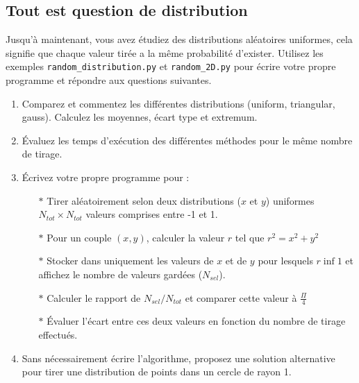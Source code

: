 \subsection{Tout est question de distribution}

Jusqu'à  maintenant, vous  avez étudiez  des distributions  aléatoires
uniformes, cela signifie que chaque valeur tirée a la même probabilité
d'exister.  Utilisez les  exemples \texttt{random\_distribution.py} et
\texttt{random\_2D.py} pour écrire votre  propre programme et répondre
aux questions suivantes.


\begin{enumerate}
\item Comparez  et commentez  les différentes  distributions (uniform,
  triangular, gauss).  Calculez les  moyennes, écart type et extremum.
\item Évaluez les  temps d'exécution des différentes  méthodes pour le
  même nombre de tirage.  %
\item Écrivez votre propre programme pour :
  \begin{itemize}
  \item[$\ast$] Tirer  aléatoirement selon deux distributions  ($x$ et
    $y$) uniformes $N_{tot} \times N_{tot}$ valeurs comprises entre -1
    et 1.
  \item[$\ast$] Pour un couple $(x,y)$, calculer la valeur $r$ tel que
    $r^2 = x^2+y^2$
  \item[$\ast$] Stocker dans  uniquement les valeurs de $x$  et de $y$
    pour lesquels $r \inf 1$ et  affichez le nombre de valeurs gardées
    ($N_{sel}$).
  \item[$\ast$] Calculer  le rapport de $N_{sel}/N_{tot}$  et comparer
    cette valeur à $\frac{\Pi}{4}$
  \item[$\ast$] Évaluer l'écart entre ces  deux valeurs en fonction du
    nombre de tirage effectués.
  \end{itemize}
\item Sans  nécessairement écrire l'algorithme, proposez  une solution
  alternative pour tirer une distribution  de points dans un cercle de
  rayon 1.


  
\end{enumerate}


\vfill
